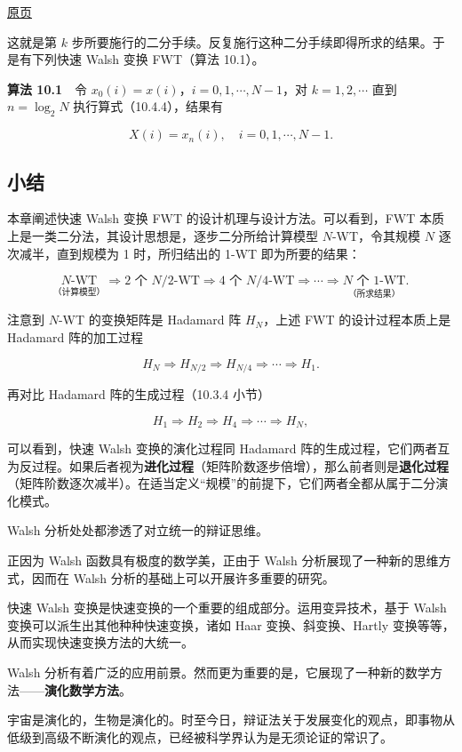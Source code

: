 \documentclass[
  10pt,
  fontset=fandol]{ctexart}
\begin{document}
\href{../../source-images/pdf-275.jpeg}{原页}

这就是第 \(k\) 步所要施行的二分手续。反复施行这种二分手续即得所求的结果。于是有下列快速 Walsh 变换 FWT（算法 10.1）。

\textbf{算法 10.1}　令 \(x_0(i)=x(i)\)，\(i=0,1,\cdots,N-1\)，对 \(k=1,2,\cdots\) 直到 \(n=\log_2N\) 执行算式（10.4.4），结果有

\[
X(i)=x_n(i),\quad i=0,1,\cdots,N-1.
\]

\subsection{小结}\label{ux5c0fux7ed3}

本章阐述快速 Walsh 变换 FWT 的设计机理与设计方法。可以看到，FWT 本质上是一类二分法，其设计思想是，逐步二分所给计算模型 \(N\)-WT，令其规模 \(N\) 逐次减半，直到规模为 1 时，所归结出的 1-WT 即为所要的结果：

\[
\underset{\text{（计算模型）}}{N\text{-WT}}\Rightarrow2\text{ 个 }N/2\text{-WT}\Rightarrow4\text{ 个 }N/4\text{-WT}\Rightarrow\cdots\Rightarrow\underset{\text{（所求结果）}}{N\text{ 个 }1\text{-WT}}.
\]

注意到 \(N\)-WT 的变换矩阵是 Hadamard 阵 \(H_N\)，上述 FWT 的设计过程本质上是 Hadamard 阵的加工过程

\[
H_N\Rightarrow H_{N/2}\Rightarrow H_{N/4}\Rightarrow\cdots\Rightarrow H_1.
\]

再对比 Hadamard 阵的生成过程（10.3.4 小节）

\[
H_1\Rightarrow H_2\Rightarrow H_4\Rightarrow\cdots\Rightarrow H_N,
\]

可以看到，快速 Walsh 变换的演化过程同 Hadamard 阵的生成过程，它们两者互为反过程。如果后者视为\textbf{进化过程}（矩阵阶数逐步倍增），那么前者则是\textbf{退化过程}（矩阵阶数逐次减半）。在适当定义``规模''的前提下，它们两者全都从属于二分演化模式。

Walsh 分析处处都渗透了对立统一的辩证思维。

正因为 Walsh 函数具有极度的数学美，正由于 Walsh 分析展现了一种新的思维方式，因而在 Walsh 分析的基础上可以开展许多重要的研究。

快速 Walsh 变换是快速变换的一个重要的组成部分。运用变异技术，基于 Walsh 变换可以派生出其他种种快速变换，诸如 Haar 变换、斜变换、Hartly 变换等等，从而实现快速变换方法的大统一。

Walsh 分析有着广泛的应用前景。然而更为重要的是，它展现了一种新的数学方法------\textbf{演化数学方法}。

宇宙是演化的，生物是演化的。时至今日，辩证法关于发展变化的观点，即事物从低级到高级不断演化的观点，已经被科学界认为是无须论证的常识了。
\end{document}
